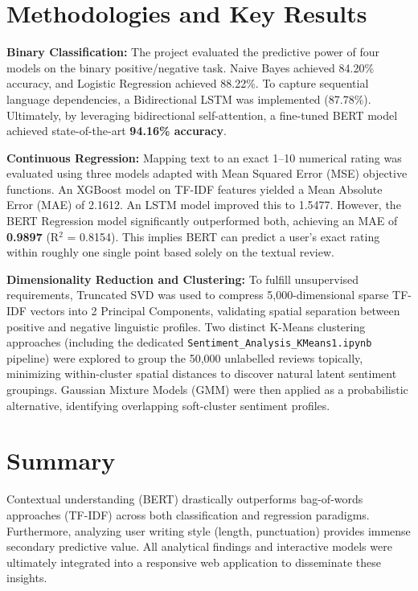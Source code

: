 \documentclass[12pt]{article}
\begin{document}
\section*{Methodologies and Key Results}

\textbf{Binary Classification:} The project evaluated the predictive power of four models on the binary positive/negative task. Naive Bayes achieved 84.20\% accuracy, and Logistic Regression achieved 88.22\%. To capture sequential language dependencies, a Bidirectional LSTM was implemented (87.78\%). Ultimately, by leveraging bidirectional self-attention, a fine-tuned BERT model achieved state-of-the-art \textbf{94.16\% accuracy}.

\vspace{1em}
\noindent
\textbf{Continuous Regression:} Mapping text to an exact 1--10 numerical rating was evaluated using three models adapted with Mean Squared Error (MSE) objective functions. An XGBoost model on TF-IDF features yielded a Mean Absolute Error (MAE) of 2.1612. An LSTM model improved this to 1.5477. However, the BERT Regression model significantly outperformed both, achieving an MAE of \textbf{0.9897} (R$^2$ = 0.8154). This implies BERT can predict a user's exact rating within roughly one single point based solely on the textual review.

\vspace{1em}
\noindent
\textbf{Dimensionality Reduction and Clustering:} To fulfill unsupervised requirements, Truncated SVD was used to compress 5,000-dimensional sparse TF-IDF vectors into 2 Principal Components, validating spatial separation between positive and negative linguistic profiles. Two distinct K-Means clustering approaches (including the dedicated \texttt{Sentiment\_Analysis\_}\allowbreak\texttt{KMeans1.ipynb} pipeline) were explored to group the 50,000 unlabelled reviews topically, minimizing within-cluster spatial distances to discover natural latent sentiment groupings. Gaussian Mixture Models (GMM) were then applied as a probabilistic alternative, identifying overlapping soft-cluster sentiment profiles.

\section*{Summary}
Contextual understanding (BERT) drastically outperforms bag-of-words approaches (TF-IDF) across both classification and regression paradigms. Furthermore, analyzing user writing style (length, punctuation) provides immense secondary predictive value. All analytical findings and interactive models were ultimately integrated into a responsive web application to disseminate these insights.
\end{document}
